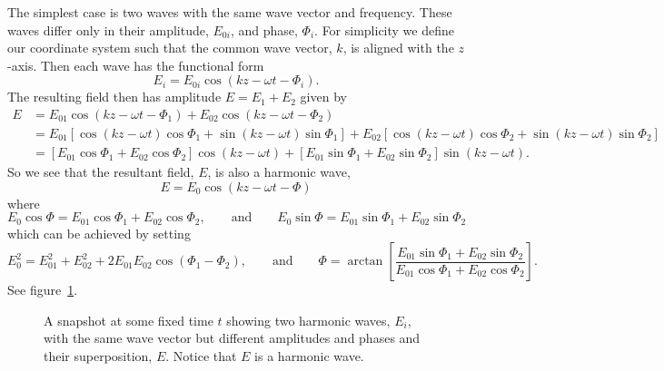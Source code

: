     The simplest case is two waves with the same wave vector and frequency.
    These waves differ only in their amplitude, \(E_{0i}\), and phase, \(\Phi_{i}\).
    For simplicity we define our coordinate system such that the common wave vector, \(k\), is aligned with the \(z\)-axis.
    Then each wave has the functional form
    \[E_{i} = E_{0i}\cos(kz - \omega t - \Phi_i).\]
    The resulting field then has amplitude \(E = E_{1} + E_{2}\) given by
    \begin{align*}
        E &= E_{01}\cos(kz - \omega t - \Phi_1) + E_{02}\cos(kz - \omega t - \Phi_2)\\
        &= E_{01}[\cos(kz - \omega t)\cos\Phi_1 + \sin(kz - \omega t) \sin\Phi_1] + E_{02}[\cos(kz - \omega t)\cos\Phi_2 + \sin(kz - \omega t)\sin\Phi_2]\\
        &= [E_{01}\cos\Phi_1 + E_{02}\cos\Phi_2]\cos(kz - \omega t) + [E_{01}\sin\Phi_1 + E_{02}\sin\Phi_2]\sin(kz - \omega t).
    \end{align*}
    So we see that the resultant field, \(E\), is also a harmonic wave,
    \[E = E_{0}\cos(kz - \omega t - \Phi)\]
    where
    \[E_{0}\cos\Phi = E_{01}\cos\Phi_1 + E_{02}\cos\Phi_2, \qquad\text{and}\qquad E_{0}\sin\Phi = E_{01}\sin\Phi_1 + E_{02}\sin\Phi_2\]
    which can be achieved by setting
    \begin{equation}\label{eqn:E0 and Phi}
        E_{0}^2 = E_{01}^2 + E_{02}^2 + 2E_{01}E_{02}\cos(\Phi_1 - \Phi_2), \qquad\text{and}\qquad \Phi = \arctan\left[ \frac{E_{01}\sin\Phi_1 + E_{02}\sin\Phi_2}{E_{01}\cos\Phi_1 + E_{02}\cos\Phi_2} \right].
    \end{equation}
    See figure~\ref{fig:superposition same k and omega}.
    
    \begin{figure}[ht]
        \centering
        \caption{A snapshot at some fixed time \(t\) showing two harmonic waves, \(E_i\), with the same wave vector but different amplitudes and phases and their superposition, \(E\). Notice that \(E\) is a harmonic wave.}
        \label{fig:superposition same k and omega}
    \end{figure}

